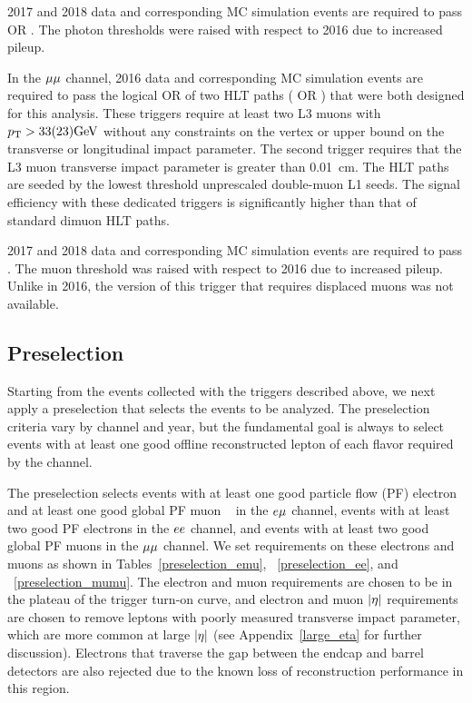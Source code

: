 2017 and 2018 data and corresponding MC simulation events are required to pass  OR  . The photon \ET thresholds were raised with respect to 2016 due to increased pileup.

In the ${\mu}{\mu}$ channel, 2016 data and corresponding MC simulation events are required to pass the logical OR of two HLT paths ( OR ) that were both designed for this analysis. These triggers require at least two L3 muons with $\pt>33(23)\si{\GeV}$ without any constraints on the vertex or upper bound on the transverse or longitudinal impact parameter. The second trigger requires that the L3 muon transverse impact parameter is greater than 0.01~\unit{cm}. The HLT paths are seeded by the lowest \pt threshold unprescaled double-muon L1 seeds. The signal efficiency with these dedicated triggers is significantly higher than that of standard dimuon HLT paths.

2017 and 2018 data and corresponding MC simulation events are required to pass . The muon \pt threshold was raised with respect to 2016 due to increased pileup. Unlike in 2016, the version of this trigger that requires displaced muons was not available.


\subsection{Preselection}
\label{preselection}
Starting from the events collected with the triggers described above, we next apply a preselection that selects the events to be analyzed. The preselection criteria vary by channel and year, but the fundamental goal is always to select events with at least one good offline reconstructed lepton of each flavor required by the channel. 

The preselection selects events with at least one good particle flow (PF) electron and at least one good global PF muon ~\cite{cms_pf} in the $e{\mu}$ channel, events with at least two good PF electrons in the $ee$ channel, and events with at least two good global PF muons in the ${\mu}{\mu}$ channel.  We set requirements on these electrons and muons as shown in Tables~\ref{preselection_emu}, ~\ref{preselection_ee}, and ~\ref{preselection_mumu}. The electron and muon \pt  requirements are chosen to be in the plateau of the trigger turn-on curve, and electron and muon $\lvert \eta \rvert$ requirements are chosen to remove leptons with poorly measured transverse impact parameter, which are more common at large $\lvert \eta \rvert$ (see Appendix~\ref{large_eta} for further discussion). Electrons that traverse the gap between the endcap and barrel detectors are also rejected due to the known loss of reconstruction performance in this region. 

